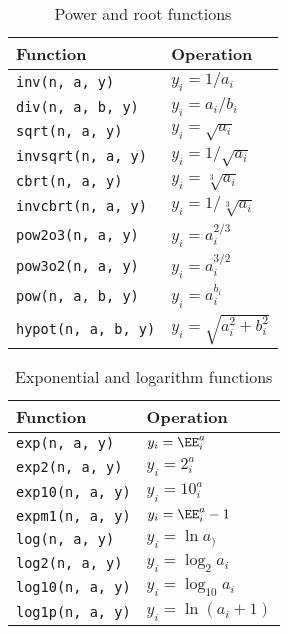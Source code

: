 \begin{table}
  \begin{tabularx}{\textwidth}{XX}
    \toprule
    Function & Operation \\
    \midrule
    \verb|inv(n, a, y)|      & $y_i = 1 / a_i$              \\
    \verb|div(n, a, b, y)|   & $y_i = a_i / b_i$            \\
    \verb|sqrt(n, a, y)|     & $y_i = \sqrt{a_i}$           \\
    \verb|invsqrt(n, a, y)|  & $y_i = 1 / \sqrt{a_i}$       \\
    \verb|cbrt(n, a, y)|     & $y_i = \sqrt[3]{a_i}$        \\
    \verb|invcbrt(n, a, y)|  & $y_i = 1 / \sqrt[3]{a_i}$    \\
    \verb|pow2o3(n, a, y)|   & $y_i = a_i^{2/3}$            \\
    \verb|pow3o2(n, a, y)|   & $y_i = a_i^{3/2}$            \\
    \verb|pow(n, a, b, y)|   & $y_i = a_i^{b_i}$            \\
    \verb|hypot(n, a, b, y)| & $y_i = \sqrt{a_i^2 + b_i^2}$ \\
    \bottomrule
  \end{tabularx}
  \caption{Power and root functions}
  \label{tab:Power and root functions}
\end{table}

\begin{table}
  \begin{tabularx}{\textwidth}{XX}
    \toprule
    Function & Operation \\
    \midrule
    \verb|exp(n, a, y)|   & $y_i = \EE^a_i$       \\
    \verb|exp2(n, a, y)|  & $y_i = 2^a_i$         \\
    \verb|exp10(n, a, y)| & $y_i = 10^a_i$        \\
    \verb|expm1(n, a, y)| & $y_i = \EE^a_i - 1$   \\
    \verb|log(n, a, y)|   & $y_i = \ln a_)$       \\
    \verb|log2(n, a, y)|  & $y_i = \log_2 a_i$    \\
    \verb|log10(n, a, y)| & $y_i = \log_{10} a_i$ \\
    \verb|log1p(n, a, y)| & $y_i = \ln(a_i + 1)$  \\
    \bottomrule
  \end{tabularx}
  \caption{Exponential and logarithm functions}
  \label{tab:Exponential and logarithm functions}
\end{table}


